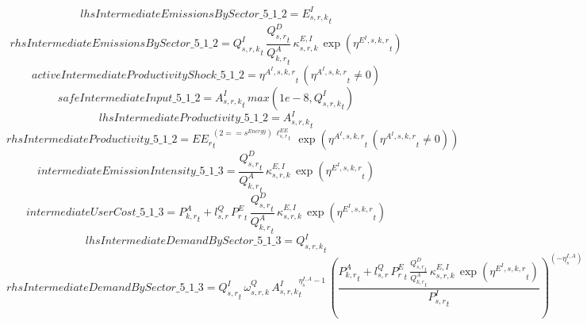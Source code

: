 \begin{dmath*}
lhsIntermediateEmissionsBySector\_5\_1\_2 = {{E^I_{s,r,k}}}_{t}
\end{dmath*}
\begin{dmath*}
rhsIntermediateEmissionsBySector\_5\_1\_2 = {{Q^{I}_{s,r,k}}}_{t}\, \frac{{{Q^{D}_{s,r}}}_{t}}{{{Q^{A}_{k,r}}}_{t}}\, {{\kappa^{E,I}_{s,r,k}}}\, \exp\left({{\eta^{E^{I},s,k,r}}}_{t}\right)
\end{dmath*}
\begin{dmath*}
activeIntermediateProductivityShock\_5\_1\_2 = {{\eta^{A^{I},s,k,r}}}_{t}\, \left({{\eta^{A^{I},s,k,r}}}_{t}\neq 0\right)
\end{dmath*}
\begin{dmath*}
safeIntermediateInput\_5\_1\_2 = {{A^{I}_{s,r,k}}}_{t}\, max(1e-8,{{Q^{I}_{s,r,k}}}_{t})
\end{dmath*}
\begin{dmath*}
lhsIntermediateProductivity\_5\_1\_2 = {{A^{I}_{s,r,k}}}_{t}
\end{dmath*}
\begin{dmath*}
rhsIntermediateProductivity\_5\_1\_2 = {{EE_r}}_{t}^{\left(2=={{s^{Energy}}}\right)\, {{\ell^{EE}_{s,r}}}_{t}}\, \exp\left({{\eta^{A^{I},s,k,r}}}_{t}\, \left({{\eta^{A^{I},s,k,r}}}_{t}\neq 0\right)\right)
\end{dmath*}
\begin{dmath*}
intermediateEmissionIntensity\_5\_1\_3 = \frac{{{Q^{D}_{s,r}}}_{t}}{{{Q^{A}_{k,r}}}_{t}}\, {{\kappa^{E,I}_{s,r,k}}}\, \exp\left({{\eta^{E^{I},s,k,r}}}_{t}\right)
\end{dmath*}
\begin{dmath*}
intermediateUserCost\_5\_1\_3 = {{P^{A}_{k,r}}}_{t}+{{l^{Q}_{s,r}}}\, {{P^E_r}}_{t}\, \frac{{{Q^{D}_{s,r}}}_{t}}{{{Q^{A}_{k,r}}}_{t}}\, {{\kappa^{E,I}_{s,r,k}}}\, \exp\left({{\eta^{E^{I},s,k,r}}}_{t}\right)
\end{dmath*}
\begin{dmath*}
lhsIntermediateDemandBySector\_5\_1\_3 = {{Q^{I}_{s,r,k}}}_{t}
\end{dmath*}
\begin{dmath*}
rhsIntermediateDemandBySector\_5\_1\_3 = {{Q^{I}_{s,r}}}_{t}\, {{\omega^{Q}_{s,r,k}}}\, {{A^{I}_{s,r,k}}}_{t}^{{{\eta^{I,A}_{s}}}-1}\, \left(\frac{{{P^{A}_{k,r}}}_{t}+{{l^{Q}_{s,r}}}\, {{P^E_r}}_{t}\, \frac{{{Q^{D}_{s,r}}}_{t}}{{{Q^{A}_{k,r}}}_{t}}\, {{\kappa^{E,I}_{s,r,k}}}\, \exp\left({{\eta^{E^{I},s,k,r}}}_{t}\right)}{{{P^{I}_{s,r}}}_{t}}\right)^{\left(-{{\eta^{I,A}_{s}}}\right)}
\end{dmath*}
